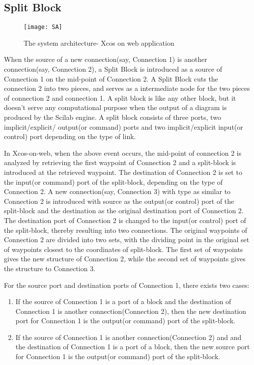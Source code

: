 \documentclass[conference]{IEEEtran}
\begin{document}
\subsection{Split Block}
\begin{figure}
    \centering
    \texttt{[image: SA]}
    \caption{The system architecture- Xcos on web application}
    \label{fig:my_label}
\end{figure}
When the source of a new connection(say, Connection 1) is another connection(say, Connection 2), a Split Block is introduced as a source of Connection 1 on the mid-point of Connection 2. A Split Block cuts the connection 2 into two pieces, and serves as a intermediate node for the two pieces of connection 2 and connection 1. A split block is like any other block, but it doesn't serve any computational purpose when the output of a diagram is produced by the Scilab engine. A split block consists of three ports, two implicit/explicit/ output(or command) ports and two implicit/explicit input(or control) port depending on the type of link.

In Xcos-on-web, when the above event occurs, the mid-point of connection 2 is analyzed by retrieving the first waypoint of Connection 2 and a split-block is introduced at the retrieved waypoint. The destination of Connection 2 is set to the input(or command) port of the split-block, depending on the type of Connection 2. A new connection(say, Connection 3) with type as similar to Connection 2 is introduced with source as the output(or control) port of the split-block and the destination as the original destination port of Connection 2. The destination port of Connection 2 is changed to the input(or control) port of the split-block, thereby resulting into two connections. The original waypoints of Connection 2 are divided into two sets, with the dividing point in the original set of waypoints closest to the coordinates of split-block. The first set of waypoints gives the new structure of Connection 2, while the second set of waypoints gives the structure to Connection 3.

For the source port and destination ports of Connection 1, there exists two cases:

\begin{enumerate}
  \item If the source of Connection 1 is a port of a block and the destination of Connection 1 is another connection(Connection 2), then the new destination port for Connection 1 is the output(or command) port of the split-block.

  \item If the source of Connection 1 is another connection(Connection 2) and  and the destination of Connection 1 is a port of a block, then the new source port for Connection 1 is the output(or command) port of the split-block.

\end{enumerate}
\end{document}
